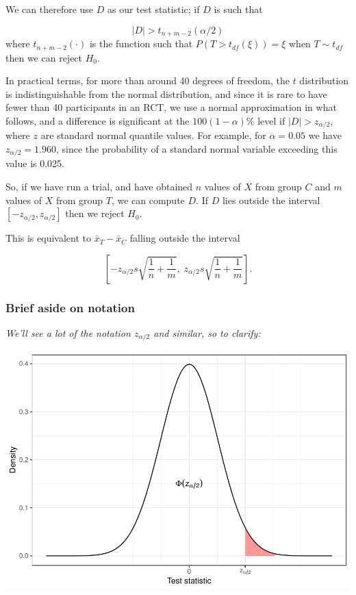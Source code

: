 \documentclass[
  openany]{book}
\theoremstyle{definition}
\theoremstyle{definition}
\theoremstyle{definition}
\theoremstyle{definition}
\theoremstyle{remark}
\begin{document}
We can therefore use \(D\) as our test statistic; if \(D\) is such that

\[ |D| > t_{n+m-2}\left(\alpha/2\right)\]
where
\(t_{n+m-2}\left(\cdot\right)\) is the function such that \(P\left(T>t_{df}\left(\xi\right)\right) = \xi\) when \(T \sim{t_{df}}\) then we can reject \(H_0\).

In practical terms, for more than around 40 degrees of freedom, the \(t\) distribution is indistinguishable from the normal distribution, and since it is rare to have fewer than 40 participants in an RCT, we use a normal approximation in what follows, and a difference is significant at the \(100\left(1-\alpha\right) \%\) level if \(|D| > z_{\alpha/2}\), where \(z\) are standard normal quantile values. For example, for \(\alpha=0.05\) we have \(z_{\alpha/2} = 1.960\), since the probability of a standard normal variable exceeding this value is 0.025.

So, if we have run a trial, and have obtained \(n\) values of \(X\) from group \(C\) and \(m\) values of \(X\) from group \(T\), we can compute \(D\). If \(D\) lies outside the interval \(\left[-z_{\alpha/2}, z_{\alpha/2}\right]\) then we reject \(H_0\).

This is equivalent to \(\bar{x}_T - \bar{x}_C\) falling outside the interval

\[\left[-z_{\alpha/2}s\sqrt{\frac{1}{n} + \frac{1}{m}},\; z_{\alpha/2}s\sqrt{\frac{1}{n} + \frac{1}{m}}  \right]. \]

\subsubsection*{Brief aside on notation}\label{brief-aside-on-notation}

\emph{We'll see a lot of the notation \(z_{\alpha/2}\) and similar, so to clarify:}

\includegraphics{CT4H_notes_files/figure-latex/unnamed-chunk-4-1.pdf}
\end{document}
